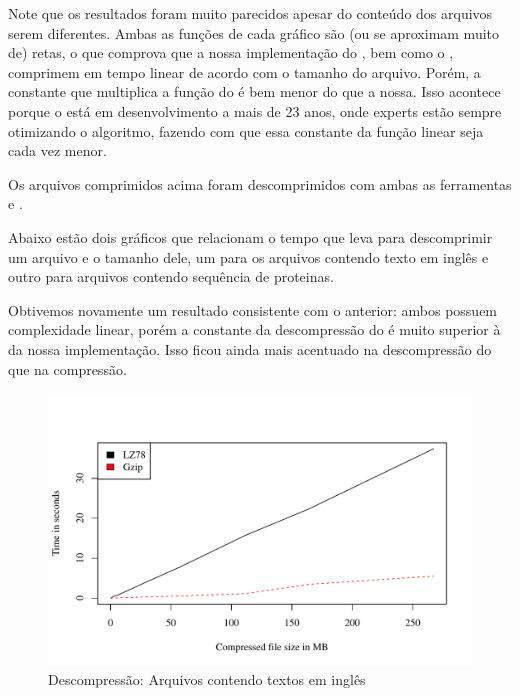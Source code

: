 Note que os resultados foram muito parecidos apesar do conteúdo dos arquivos
serem diferentes.
Ambas as funções de cada gráfico são (ou se aproximam muito de) retas, o que comprova que a
nossa implementação do \lz, bem como o \gzip, comprimem em tempo linear de
acordo com o tamanho do arquivo. Porém, a constante que multiplica a função do
\gzip é bem menor do que a nossa. Isso acontece porque o \gzip está em
desenvolvimento a mais de 23 anos, onde experts estão sempre otimizando o
algoritmo, fazendo com que essa constante da função linear seja cada vez menor.




Os arquivos comprimidos acima foram descomprimidos com ambas as ferramentas \lz
e \gzip.


Abaixo estão dois gráficos que relacionam o tempo que leva para descomprimir
um arquivo e o tamanho dele, um para os arquivos contendo texto em inglês e
outro para arquivos contendo sequência de proteinas.



Obtivemos novamente um resultado consistente com o anterior: ambos possuem
complexidade linear, porém a constante da descompressão do \gzip é muito
superior à da nossa implementação. Isso ficou ainda mais acentuado na
descompressão do que na compressão.

\begin{figure}[ht]
\includegraphics[scale=0.74]{../experiments/R/pdf/time_decomp}
\caption{Descompressão: Arquivos contendo textos em inglês}
\end{figure}

